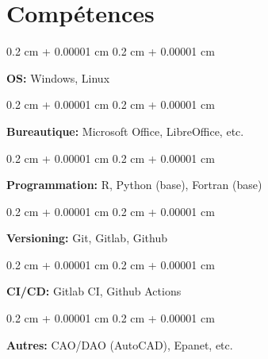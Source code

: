 \documentclass[10pt, letterpaper]{article}
\newenvironment{onecolentry}{
  \begin{adjustwidth}{
    0.2 cm + 0.00001 cm
  }{
    0.2 cm + 0.00001 cm
  }
}{
  \end{adjustwidth}
} %
\begin{document}

\section{Compétences}
  \begin{onecolentry}
    \textbf{OS:} Windows, Linux
  \end{onecolentry}

  \vspace{0.1 cm}

  \begin{onecolentry}
    \textbf{Bureautique:} Microsoft Office, LibreOffice, etc.
  \end{onecolentry}

  \vspace{0.1 cm}

  \begin{onecolentry}
    \textbf{Programmation:} R, Python (base), Fortran (base)
  \end{onecolentry}

  \vspace{0.1 cm}

  \begin{onecolentry}
    \textbf{Versioning:} Git, Gitlab, Github
  \end{onecolentry}

  \vspace{0.1 cm}

  \begin{onecolentry}
    \textbf{CI/CD:} Gitlab CI, Github Actions
  \end{onecolentry}

  \vspace{0.1 cm}

  \begin{onecolentry}
    \textbf{Autres:} CAO/DAO (AutoCAD), Epanet, etc.
  \end{onecolentry}
\end{document}
